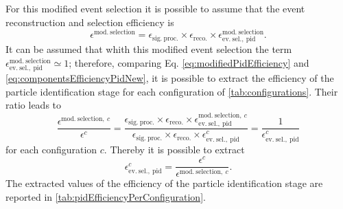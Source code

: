 For this modified event selection it is possible to assume that the event reconstruction and selection efficiency is \begin{equation}
    \epsilon^\mathrm{mod.\ selection} = \epsilon_\mathrm{sig.\ proc.} \times 
        \epsilon_\mathrm{reco.} \times 
        \epsilon_\mathrm{ev.\ sel.,\ pid}^\mathrm{mod.\ selection}. 
        \label{eq:modifiedPidEfficiency}
\end{equation} It can be assumed that whith this modified event selection the term $\epsilon_\mathrm{ev.\ sel.,\ pid}^\mathrm{mod.\ selection}\simeq1$; therefore, comparing Eq. \eqref{eq:modifiedPidEfficiency} and \eqref{eq:componentsEfficiencyPidNew}, it is possible to extract the efficiency of the particle identification stage for each configuration of \autoref{tab:configurations}. Their ratio leads to \begin{equation}
    \frac{
    \epsilon^{\mathrm{mod.\ selection,}\ c}
    }{
    \epsilon^{c}
    } = \frac{
    \epsilon_\mathrm{sig.\ proc.} \times 
    \epsilon_\mathrm{reco.} \times 
    \epsilon_\mathrm{ev.\ sel.,\ pid}^{\mathrm{mod.\ selection,}\ c}
    }{
    \epsilon_\mathrm{sig.\ proc.} \times 
    \epsilon_\mathrm{reco.} \times 
    \epsilon_\mathrm{ev.\ sel.,\ pid}^c
    } = \frac1{\epsilon_\mathrm{ev.\ sel.,\ pid}^c}
\end{equation} for each configuration $c$. Thereby it is possible to extract \begin{equation}
    \epsilon_\mathrm{ev.\ sel.,\ pid}^c = \frac{
    \epsilon^{c}
    }{
    \epsilon^{\mathrm{mod.\ selection,}\ c}
    }. 
\end{equation} The extracted values of the efficiency of the particle identification stage are reported in \autoref{tab:pidEfficiencyPerConfiguration}. 

